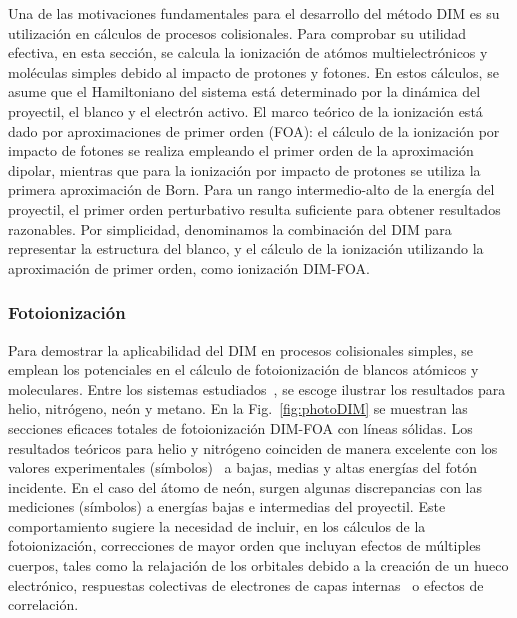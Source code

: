 Una de las motivaciones fundamentales para el desarrollo del método DIM 
es su utilización en cálculos de procesos colisionales. Para comprobar 
su utilidad efectiva, en esta sección, se calcula la ionización de 
atómos multielectrónicos y moléculas simples debido al impacto de 
protones y fotones. En estos cálculos, se asume que el Hamiltoniano del 
sistema está determinado por la dinámica del proyectil, el blanco y el 
electrón activo. El marco teórico de la ionización está dado por 
aproximaciones de primer orden (FOA): el cálculo de la ionización por 
impacto de fotones se realiza empleando el primer orden de la 
aproximación dipolar, mientras que para la ionización por impacto de 
protones se utiliza la primera aproximación de Born. Para un rango 
intermedio-alto de la energía del proyectil, el primer orden 
perturbativo resulta suficiente para obtener resultados razonables. Por 
simplicidad, denominamos la combinación del DIM para representar la 
estructura del blanco, y el cálculo de la ionización utilizando la 
aproximación de primer orden, como ionización DIM-FOA. 

\subsubsection{Fotoionización}

Para demostrar la aplicabilidad del DIM en procesos colisionales 
simples, se emplean los potenciales en el cálculo de fotoionización de 
blancos atómicos y moleculares. Entre los sistemas 
estudiados~\cite{Mendez:19dim}, se escoge ilustrar los 
resultados para helio, nitrógeno, neón y metano. En la 
Fig.~\ref{fig:photoDIM} se muestran las secciones eficaces totales de 
fotoionización DIM-FOA con líneas sólidas. Los resultados teóricos para 
helio y nitrógeno coinciden de manera excelente con los valores 
experimentales (símbolos)~\cite{Samson:90,Henke:93,Stolte:16} a bajas, 
medias y altas energías del fotón incidente. En el caso del átomo de 
neón, surgen algunas discrepancias con las mediciones (símbolos) 
\cite{Henke:93,Samson:02} a energías bajas e intermedias del proyectil. 
Este comportamiento sugiere la necesidad de incluir, en los cálculos de 
la fotoionización, correcciones de mayor orden que incluyan efectos de 
múltiples cuerpos, tales como la relajación de los orbitales 
debido a la creación de un hueco electrónico, respuestas colectivas de 
electrones de capas internas~\cite{Ederer:64} o efectos de correlación.

